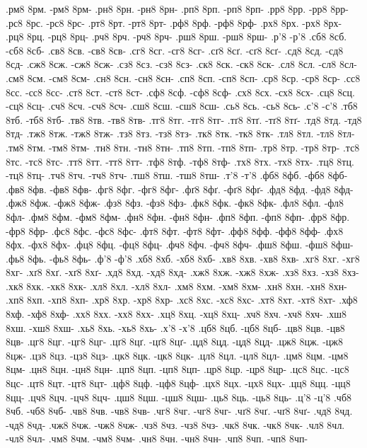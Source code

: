 {.рм8 8рм. -рм8 8рм-
.рн8 8рн. -рн8 8рн-
.рп8 8рп. -рп8 8рп-
.рр8 8рр. -рр8 8рр-
.рс8 8рс. -рс8 8рс-
.рт8 8рт. -рт8 8рт-
.рф8 8рф. -рф8 8рф-
.рх8 8рх. -рх8 8рх-
.рц8 8рц. -рц8 8рц-
.рч8 8рч. -рч8 8рч-
.рш8 8рш. -рш8 8рш-
.р'8 -р'8
.сб8 8сб. -сб8 8сб-
.св8 8св. -св8 8св-
.сг8 8сг. -сг8 8сг-
.сґ8 8сґ. -сґ8 8сґ-
.сд8 8сд. -сд8 8сд-
.сж8 8сж. -сж8 8сж-
.сз8 8сз. -сз8 8сз-
.ск8 8ск. -ск8 8ск-
.сл8 8сл. -сл8 8сл-
.см8 8см. -см8 8см-
.сн8 8сн. -сн8 8сн-
.сп8 8сп. -сп8 8сп-
.ср8 8ср. -ср8 8ср-
.сс8 8сс. -сс8 8сс-
.ст8 8ст. -ст8 8ст-
.сф8 8сф. -сф8 8сф-
.сх8 8сх. -сх8 8сх-
.сц8 8сц. -сц8 8сц-
.сч8 8сч. -сч8 8сч-
.сш8 8сш. -сш8 8сш-
.сь8 8сь. -сь8 8сь-
.с'8 -с'8
.тб8 8тб. -тб8 8тб-
.тв8 8тв. -тв8 8тв-
.тг8 8тг. -тг8 8тг-
.тґ8 8тґ. -тґ8 8тґ-
.тд8 8тд. -тд8 8тд-
.тж8 8тж. -тж8 8тж-
.тз8 8тз. -тз8 8тз-
.тк8 8тк. -тк8 8тк-
.тл8 8тл. -тл8 8тл-
.тм8 8тм. -тм8 8тм-
.тн8 8тн. -тн8 8тн-
.тп8 8тп. -тп8 8тп-
.тр8 8тр. -тр8 8тр-
.тс8 8тс. -тс8 8тс-
.тт8 8тт. -тт8 8тт-
.тф8 8тф. -тф8 8тф-
.тх8 8тх. -тх8 8тх-
.тц8 8тц. -тц8 8тц-
.тч8 8тч. -тч8 8тч-
.тш8 8тш. -тш8 8тш-
.т'8 -т'8
.фб8 8фб. -фб8 8фб-
.фв8 8фв. -фв8 8фв-
.фг8 8фг. -фг8 8фг-
.фґ8 8фґ. -фґ8 8фґ-
.фд8 8фд. -фд8 8фд-
.фж8 8фж. -фж8 8фж-
.фз8 8фз. -фз8 8фз-
.фк8 8фк. -фк8 8фк-
.фл8 8фл. -фл8 8фл-
.фм8 8фм. -фм8 8фм-
.фн8 8фн. -фн8 8фн-
.фп8 8фп. -фп8 8фп-
.фр8 8фр. -фр8 8фр-
.фс8 8фс. -фс8 8фс-
.фт8 8фт. -фт8 8фт-
.фф8 8фф. -фф8 8фф-
.фх8 8фх. -фх8 8фх-
.фц8 8фц. -фц8 8фц-
.фч8 8фч. -фч8 8фч-
.фш8 8фш. -фш8 8фш-
.фь8 8фь. -фь8 8фь-
.ф'8 -ф'8
.хб8 8хб. -хб8 8хб-
.хв8 8хв. -хв8 8хв-
.хг8 8хг. -хг8 8хг-
.хґ8 8хґ. -хґ8 8хґ-
.хд8 8хд. -хд8 8хд-
.хж8 8хж. -хж8 8хж-
.хз8 8хз. -хз8 8хз-
.хк8 8хк. -хк8 8хк-
.хл8 8хл. -хл8 8хл-
.хм8 8хм. -хм8 8хм-
.хн8 8хн. -хн8 8хн-
.хп8 8хп. -хп8 8хп-
.хр8 8хр. -хр8 8хр-
.хс8 8хс. -хс8 8хс-
.хт8 8хт. -хт8 8хт-
.хф8 8хф. -хф8 8хф-
.хх8 8хх. -хх8 8хх-
.хц8 8хц. -хц8 8хц-
.хч8 8хч. -хч8 8хч-
.хш8 8хш. -хш8 8хш-
.хь8 8хь. -хь8 8хь-
.х'8 -х'8
.цб8 8цб. -цб8 8цб-
.цв8 8цв. -цв8 8цв-
.цг8 8цг. -цг8 8цг-
.цґ8 8цґ. -цґ8 8цґ-
.цд8 8цд. -цд8 8цд-
.цж8 8цж. -цж8 8цж-
.цз8 8цз. -цз8 8цз-
.цк8 8цк. -цк8 8цк-
.цл8 8цл. -цл8 8цл-
.цм8 8цм. -цм8 8цм-
.цн8 8цн. -цн8 8цн-
.цп8 8цп. -цп8 8цп-
.цр8 8цр. -цр8 8цр-
.цс8 8цс. -цс8 8цс-
.цт8 8цт. -цт8 8цт-
.цф8 8цф. -цф8 8цф-
.цх8 8цх. -цх8 8цх-
.цц8 8цц. -цц8 8цц-
.цч8 8цч. -цч8 8цч-
.цш8 8цш. -цш8 8цш-
.ць8 8ць. -ць8 8ць-
.ц'8 -ц'8
.чб8 8чб. -чб8 8чб-
.чв8 8чв. -чв8 8чв-
.чг8 8чг. -чг8 8чг-
.чґ8 8чґ. -чґ8 8чґ-
.чд8 8чд. -чд8 8чд-
.чж8 8чж. -чж8 8чж-
.чз8 8чз. -чз8 8чз-
.чк8 8чк. -чк8 8чк-
.чл8 8чл. -чл8 8чл-
.чм8 8чм. -чм8 8чм-
.чн8 8чн. -чн8 8чн-
.чп8 8чп. -чп8 8чп-
}
